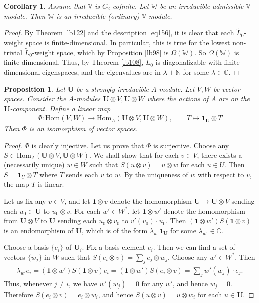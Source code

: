 \documentclass[12pt,b5paper,notitlepage]{report}
\theoremstyle{definition}
\theoremstyle{plain}
\newtheorem{pp}[df]{Proposition}
\newtheorem{co}[df]{Corollary}
\newcommand{\wtd}{\widetilde}
\newcommand{\id}{\mathbf{1}}
\newcommand{\Hom}{\mathrm{Hom}}
\newcommand{\mbf}{\mathbf}
\newcommand{\Vbb}{\mathbb V}
\newcommand{\Wbb}{\mathbb W}
\newcommand{\Cbb}{\mathbb C}
\newcommand{\Nbb}{\mathbb N}
\numberwithin{equation}{section}
\begin{document}
\begin{co}\label{lb99}
Assume that $\Vbb$ is $C_2$-cofinite. Let $\Wbb$ be an irreducible  admissible $\Vbb$-module. Then $\Wbb$ is an irreducible (ordinary) $\Vbb$-module.
\end{co}


\begin{proof}
By Theorem \ref{lb122} and the description \eqref{eq156}, it is clear that each $\wtd L_0$-weight space is finite-dimensional. In particular, this is true for the lowest non-trivial $\wtd L_0$-weight space, which by Proposition \ref{lb98} is $\Omega(\Wbb)$. So $\Omega(\Wbb)$ is finite-dimensional. Thus, by Theorem \ref{lb108}, $L_0$ is diagonalizable with finite dimensional eigenspaces, and the eigenvalues are in $\lambda+\Nbb$ for some $\lambda\in\Cbb$.
\end{proof}




\begin{pp}\label{lb115}
Let $\mbf U$ be a strongly irreducible $A$-module. Let $V,W$ be  vector spaces. Consider the $A$-modules $\mbf U\otimes V,\mbf U\otimes W$ where the actions of $A$ are on the $\mbf U$-component. Define a linear  map
\begin{align*}
\Phi:\Hom(V,W)\rightarrow \Hom_A(\mbf U\otimes V,\mbf U\otimes W),\qquad T\mapsto \id_{\mbf U}\otimes T
\end{align*}
Then $\Phi$ is an isomorphism of vector spaces.
\end{pp}
\begin{proof}	$\Phi$ is clearly injective. Let us prove that $\Phi$ is surjective. Choose any $S\in\Hom_A(\mbf U\otimes V,\mbf U\otimes W)$. We shall show that for each $v\in V$, there exists a (necessarily unique) $w\in W$ such that $S(u\otimes v)=u\otimes w$ for each $u\in U$. Then $S=\id_U\otimes T$ where $T$ sends each $v$ to $w$. By the uniqueness of $w$ with respect to $v$, the map $T$ is linear.

Let us fix any $v\in V$, and let $\id\otimes v$ denote the homomorphism $\mbf U\rightarrow\mbf U\otimes V$ sending each $u_0\in\mbf U$ to $u_0\otimes v$. For each $w'\in W^*$, let $\id\otimes w'$ denote the homomorphism from $\mbf U\otimes V$ to $\mbf U$ sending each $u_0\otimes v_0$ to $v'(v_0)\cdot u_0$. Then $(\id\otimes w')S(\id\otimes v)$ is an endomorphism of $\mbf U$, which is of the form $\lambda_{w'}\id_{\mbf U}$ for some $\lambda_{w'}\in \Cbb$. 
	
Choose a basis $\{e_i\}$ of $\mbf U_i$. Fix a basis element $e_i$. Then we can find a set of vectors $\{w_j\}$ in $W$ such that $S(e_i\otimes v)=\sum_j e_j\otimes w_j$. Choose any $w'\in W^*$. Then
	\begin{align*}
	\lambda_{w'}e_i=(\id\otimes w')S(\id\otimes v)e_i=(\id\otimes w')S(e_i\otimes v)=\sum_j w'(w_j)\cdot e_j.
	\end{align*}
	Thus, whenever $j\neq i$, we have $w'(w_j)=0$ for any $w'$, and hence $w_j=0$. Therefore $S(e_i\otimes v)=e_i\otimes w_i$, and hence $S(u\otimes v)=u\otimes w_i$ for each $u\in\mbf U$. 
\end{proof}
\end{document}
